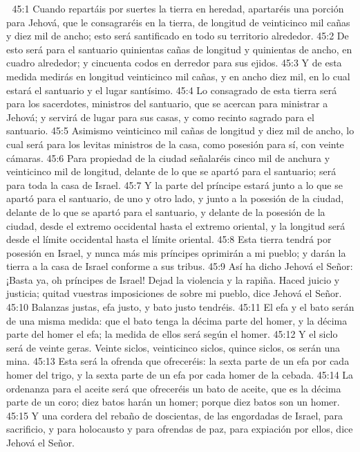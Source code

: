 
45:1 Cuando repartáis por suertes la tierra en heredad, apartaréis una porción para Jehová, que le consagraréis en la tierra, de longitud de veinticinco mil cañas   y diez mil de ancho; esto será santificado en todo su territorio alrededor.  
45:2 De esto será para el santuario quinientas cañas   de longitud y quinientas de ancho, en cuadro alrededor; y cincuenta codos en derredor para sus ejidos.  
45:3 Y de esta medida medirás en longitud veinticinco mil cañas,   y en ancho diez mil, en lo cual estará el santuario y el lugar santísimo.  
45:4 Lo consagrado de esta tierra será para los sacerdotes, ministros del santuario, que se acercan para ministrar a Jehová; y servirá de lugar para sus casas, y como recinto sagrado para el santuario.  
45:5 Asimismo veinticinco mil cañas   de longitud y diez mil de ancho, lo cual será para los levitas ministros de la casa, como posesión para sí, con veinte cámaras.  
45:6 Para propiedad de la ciudad señalaréis cinco mil de anchura y veinticinco mil de longitud, delante de lo que se apartó para el santuario; será para toda la casa de Israel.  
45:7 Y la parte del príncipe estará junto a lo que se apartó para el santuario, de uno y otro lado, y junto a la posesión de la ciudad, delante de lo que se apartó para el santuario, y delante de la posesión de la ciudad, desde el extremo occidental hasta el extremo oriental, y la longitud será desde el límite occidental hasta el límite oriental.  
45:8 Esta tierra tendrá por posesión en Israel, y nunca más mis príncipes oprimirán a mi pueblo; y darán la tierra a la casa de Israel conforme a sus tribus.  
45:9 Así ha dicho Jehová el Señor: ¡Basta ya, oh príncipes de Israel! Dejad la violencia y la rapiña. Haced juicio y justicia; quitad vuestras imposiciones de sobre mi pueblo, dice Jehová el Señor.  
45:10 Balanzas justas, efa justo, y bato justo tendréis. 
45:11 El efa   y el bato serán de una misma medida: que el bato tenga la décima parte del homer, y la décima parte del homer el efa; la medida de ellos será según el homer.  
45:12 Y el siclo   será de veinte geras. Veinte siclos, veinticinco siclos, quince siclos, os serán una mina.  
45:13 Esta será la ofrenda que ofreceréis: la sexta parte de un efa   por cada homer del trigo, y la sexta parte de un efa por cada homer de la cebada.  
45:14 La ordenanza para el aceite será que ofreceréis un bato   de aceite, que es la décima parte de un coro; diez batos harán un homer; porque diez batos son un homer.  
45:15 Y una cordera del rebaño de doscientas, de las engordadas de Israel, para sacrificio, y para holocausto y para ofrendas de paz, para expiación por ellos, dice Jehová el Señor.  
